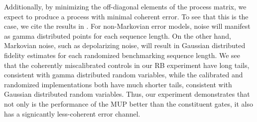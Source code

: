 \documentclass[aps,nofootinbib,pra,notitlepage,twocolumn]{revtex4-1}
\begin{document}
Additionally, by minimizing the off-diagonal elements of the process matrix, we expect to produce a process with minimal coherent error. To see that this is the case, we cite the results in \cite{Ball2016}. For non-Markovian error models, noise will manifest as gamma distributed points for each sequence length. On the other hand, Markovian noise, such as depolarizing noise, will result in Gaussian distributed fidelity estimates for each randomized benchmarking sequence length. We see that the coherently miscalibrated controls in our RB experiment have long tails, consistent with gamma distributed random variables, while the calibrated and randomized implementations both have much shorter tails, consistent with Gaussian distributed random variables. Thus, our experiment demonstrates that not only is the performance of the MUP better than the constituent gates, it also has a signicantly less-coherent error channel.
\end{document}

